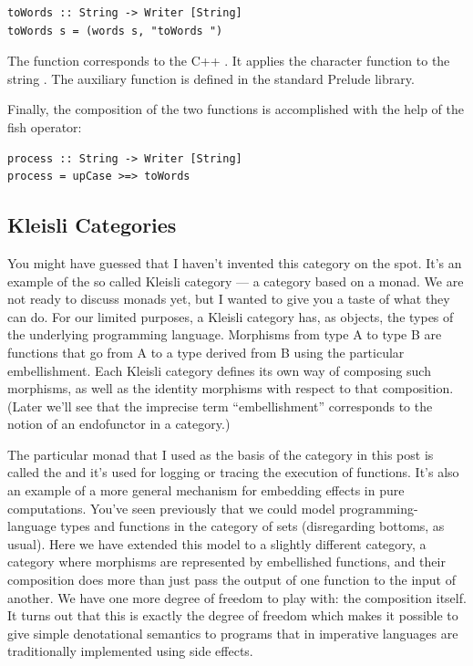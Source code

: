 \begin{verbatim}
toWords :: String -> Writer [String]
toWords s = (words s, "toWords ")
\end{verbatim}

The function  corresponds to the C++ . It
applies the character function  to the string
. The auxiliary function  is defined in the
standard Prelude library.

Finally, the composition of the two functions is accomplished with the
help of the fish operator:

\begin{verbatim}
process :: String -> Writer [String]
process = upCase >=> toWords
\end{verbatim}

\subsection{Kleisli Categories}\label{kleisli-categories}

You might have guessed that I haven't invented this category on the
spot. It's an example of the so called Kleisli category --- a category
based on a monad. We are not ready to discuss monads yet, but I wanted
to give you a taste of what they can do. For our limited purposes, a
Kleisli category has, as objects, the types of the underlying
programming language. Morphisms from type A to type B are functions that
go from A to a type derived from B using the particular embellishment.
Each Kleisli category defines its own way of composing such morphisms,
as well as the identity morphisms with respect to that composition.
(Later we'll see that the imprecise term ``embellishment'' corresponds
to the notion of an endofunctor in a category.)

The particular monad that I used as the basis of the category in this
post is called the  and it's used for logging or
tracing the execution of functions. It's also an example of a more
general mechanism for embedding effects in pure computations. You've
seen previously that we could model programming-language types and
functions in the category of sets (disregarding bottoms, as usual). Here
we have extended this model to a slightly different category, a category
where morphisms are represented by embellished functions, and their
composition does more than just pass the output of one function to the
input of another. We have one more degree of freedom to play with: the
composition itself. It turns out that this is exactly the degree of
freedom which makes it possible to give simple denotational semantics to
programs that in imperative languages are traditionally implemented
using side effects.

